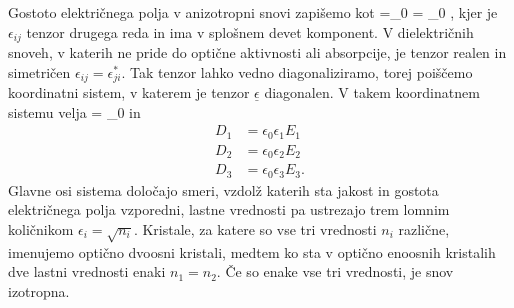 Gostoto električnega polja v anizotropni snovi zapišemo kot 
\beq
{}=\epsilon_{0}\underline{\epsilon} \cdot{} = 
\epsilon_{0}
,
\label{eq:gostota-elektricnega-polja-tenzor}
\eeq
kjer je $\epsilon_{ij}$ tenzor drugega reda in ima v splošnem devet komponent.
V dielektričnih snoveh, v katerih ne pride do optične aktivnosti ali absorpcije, je tenzor
realen in simetričen $\epsilon_{ij}=\epsilon_{ji}^*$. Tak tenzor lahko vedno
diagonaliziramo, torej poiščemo koordinatni sistem, v katerem je tenzor $\underline{\epsilon}$
diagonalen. V takem koordinatnem sistemu velja 
\beq
{} = \epsilon_{0}
\eeq
in 
\begin{align}
D_{1}&=\epsilon_{0}\epsilon_{1}E_{1}\nonumber \\
D_{2}&=\epsilon_{0}\epsilon_{2}E_{2}\nonumber \\
D_{3}&=\epsilon_{0}\epsilon_{3}E_{3}.\label{eq:gostota-elektricnega-polja-lastni}
\end{align}
Glavne osi sistema določajo smeri, vzdolž katerih sta jakost
in gostota električnega polja vzporedni, lastne vrednosti 
pa ustrezajo trem lomnim količnikom $\epsilon_{i}=\sqrt{n_{i}}$. Kristale,
za katere so vse tri vrednosti $n_i$ različne, imenujemo optično dvoosni kristali, 
medtem ko sta v optično enoosnih kristalih dve lastni vrednosti enaki $n_{1}=n_{2}$. 
Če so enake vse tri vrednosti, je snov izotropna.

